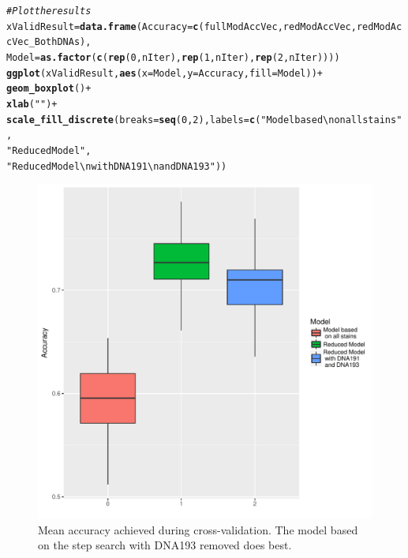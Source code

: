 \documentclass[a4paper]{article}\usepackage[]{graphicx}\usepackage[]{color}
\makeatletter
\def\maxwidth{ %
  \ifdim\Gin@nat@width>\linewidth
    \linewidth
  \else
    \Gin@nat@width
  \fi
}
\newcommand{\hlnum}[1]{\textcolor[rgb]{0.686,0.059,0.569}{#1}}%
\newcommand{\hlstr}[1]{\textcolor[rgb]{0.192,0.494,0.8}{#1}}%
\newcommand{\hlcom}[1]{\textcolor[rgb]{0.678,0.584,0.686}{\textit{#1}}}%
\newcommand{\hlopt}[1]{\textcolor[rgb]{0,0,0}{#1}}%
\newcommand{\hlstd}[1]{\textcolor[rgb]{0.345,0.345,0.345}{#1}}%
\newcommand{\hlkwb}[1]{\textcolor[rgb]{0.69,0.353,0.396}{#1}}%
\newcommand{\hlkwc}[1]{\textcolor[rgb]{0.333,0.667,0.333}{#1}}%
\newcommand{\hlkwd}[1]{\textcolor[rgb]{0.737,0.353,0.396}{\textbf{#1}}}%
\newenvironment{kframe}{%
 \def\at@end@of@kframe{}%
 \ifinner\ifhmode%
  \def\at@end@of@kframe{\end{minipage}}%
  \begin{minipage}{\columnwidth}%
 \fi\fi%
 \def\FrameCommand##1{\hskip\@totalleftmargin \hskip-\fboxsep
 \colorbox{shadecolor}{##1}\hskip-\fboxsep
     \hskip-\linewidth \hskip-\@totalleftmargin \hskip\columnwidth}%
 \MakeFramed {\advance\hsize-\width
   \@totalleftmargin\z@ \linewidth\hsize
   \@setminipage}}%
 {\par\unskip\endMakeFramed%
 \at@end@of@kframe}
\newenvironment{knitrout}{}{} %
\makeatother
\begin{document}
\begin{knitrout}
\begin{kframe}
\begin{alltt}
\hlcom{# Plot the results}
\hlstd{xValidResult} \hlkwb{=} \hlkwd{data.frame}\hlstd{(}\hlkwc{Accuracy}\hlstd{=}\hlkwd{c}\hlstd{(fullModAccVec,redModAccVec,redModAccVec_BothDNAs),}
                          \hlkwc{Model}\hlstd{=}\hlkwd{as.factor}\hlstd{(}\hlkwd{c}\hlstd{(}\hlkwd{rep}\hlstd{(}\hlnum{0}\hlstd{,nIter),}\hlkwd{rep}\hlstd{(}\hlnum{1}\hlstd{,nIter),}\hlkwd{rep}\hlstd{(}\hlnum{2}\hlstd{,nIter))))}
\hlkwd{ggplot}\hlstd{(xValidResult,}\hlkwd{aes}\hlstd{(}\hlkwc{x}\hlstd{=Model,}\hlkwc{y}\hlstd{=Accuracy,}\hlkwc{fill}\hlstd{=Model))} \hlopt{+}
  \hlkwd{geom_boxplot}\hlstd{()} \hlopt{+}
  \hlkwd{xlab}\hlstd{(}\hlstr{""}\hlstd{)} \hlopt{+}
  \hlkwd{scale_fill_discrete}\hlstd{(}\hlkwc{breaks}\hlstd{=}\hlkwd{seq}\hlstd{(}\hlnum{0}\hlstd{,}\hlnum{2}\hlstd{),}\hlkwc{labels}\hlstd{=}\hlkwd{c}\hlstd{(}\hlstr{"Model based\textbackslash{}n on all stains"}\hlstd{,}
                                               \hlstr{"Reduced Model"}\hlstd{,}
                                               \hlstr{"Reduced Model\textbackslash{}n with DNA191\textbackslash{}n and DNA193"}\hlstd{))}
\end{alltt}
\end{kframe}\begin{figure}[t]
\includegraphics[width=\maxwidth]{figure/FigModelCrossVal1-1} \caption[Mean accuracy achieved during cross-validation]{Mean accuracy achieved during cross-validation. The model based on the step search with DNA193 removed does best.}\label{fig:FigModelCrossVal1}
\end{figure}


\end{knitrout}
\end{document}
